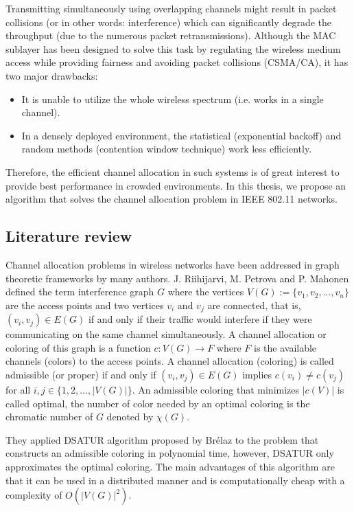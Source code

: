 \documentclass[a4paper, 12pt]{article}
\begin{document}
Transmitting simultaneously using overlapping channels might result in packet collisions (or in other words: interference) which can significantly degrade the throughput (due to the numerous packet retransmissions). Although the MAC sublayer has been designed to solve this task by regulating the wireless medium access while providing fairness and avoiding packet collisions (CSMA/CA), it has two major drawbacks: 
\begin{itemize}
\item It is unable to utilize the whole wireless spectrum (i.e. works in a single channel).
\item In a densely deployed environment, the statistical (exponential backoff) and random methods (contention window technique) work less efficiently.
\end{itemize} 
Therefore, the efficient channel allocation in such systems is of great interest to provide best performance in crowded environments. In this thesis, we propose an algorithm that solves the channel allocation problem in IEEE 802.11 networks.


\subsection{Literature review}
Channel allocation problems in wireless networks have been addressed in graph theoretic frameworks by many authors. J. Riihijarvi, M. Petrova and P. Mahonen \cite{marina} defined the term interference graph $G$ where the vertices $V(G):=\lbrace v_1,v_2, \ldots, v_n \rbrace$ are the access points and two vertices $v_i$ and $v_j$ are connected, that is, $(v_i,v_j) \in E(G)$ if and only if their traffic would interfere if they were communicating on the same channel simultaneously. A channel allocation or coloring of this graph is a function $c\colon V(G) \to F$ where $F$ is the available channels (colors) to the access points. A channel allocation (coloring) is called admissible (or proper) if and only if $(v_i,v_j) \in E(G)$ implies $c(v_i) \neq c(v_j)$ for all $i,j \in \lbrace 1, 2, \ldots, |V(G)| \rbrace$. An admissible coloring that minimizes $|c(V)|$ is called optimal, the number of color needed by an optimal coloring is the chromatic number of $G$ denoted by $\chi(G)$. 

They applied DSATUR algorithm proposed by Brélaz \cite{dsatur} to the problem that constructs an admissible coloring in polynomial time, however, DSATUR only approximates the optimal coloring. The main advantages of this algorithm are that it can be used in a distributed manner and is computationally cheap with a complexity of $O(|V(G)|^2)$. 
\end{document}
